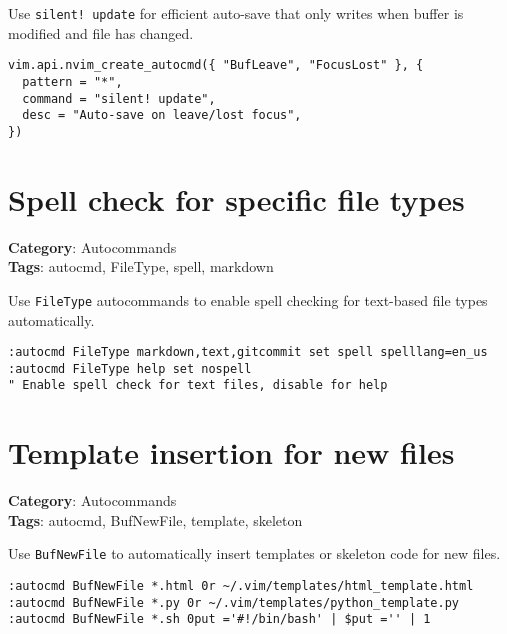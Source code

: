 Use {\footnotesize \Verb§silent! update§} for efficient auto-save that only writes when buffer is modified and file has changed.

\begin{Exa*}{}
\begin{Verbatim}[fontsize=\footnotesize, breaklines, breakanywhere]
vim.api.nvim_create_autocmd({ "BufLeave", "FocusLost" }, {
  pattern = "*",
  command = "silent! update",
  desc = "Auto-save on leave/lost focus",
})
\end{Verbatim}
\end{Exa*}

\section{Spell check for specific file types}

\textbf{Category}: Autocommands\\ \textbf{Tags}: autocmd, FileType, spell, markdown
\vspace{0.5cm}

Use {\footnotesize \Verb§FileType§} autocommands to enable spell checking for text-based file types automatically.

\begin{Exa*}{}
\begin{Verbatim}[fontsize=\footnotesize, breaklines, breakanywhere]
:autocmd FileType markdown,text,gitcommit set spell spelllang=en_us
:autocmd FileType help set nospell
" Enable spell check for text files, disable for help
\end{Verbatim}
\end{Exa*}

\section{Template insertion for new files}

\textbf{Category}: Autocommands\\ \textbf{Tags}: autocmd, BufNewFile, template, skeleton
\vspace{0.5cm}

Use {\footnotesize \Verb§BufNewFile§} to automatically insert templates or skeleton code for new files.

\begin{Exa*}{}
\begin{Verbatim}[fontsize=\footnotesize, breaklines, breakanywhere]
:autocmd BufNewFile *.html 0r ~/.vim/templates/html_template.html
:autocmd BufNewFile *.py 0r ~/.vim/templates/python_template.py
:autocmd BufNewFile *.sh 0put ='#!/bin/bash' | $put ='' | 1
\end{Verbatim}
\end{Exa*}

